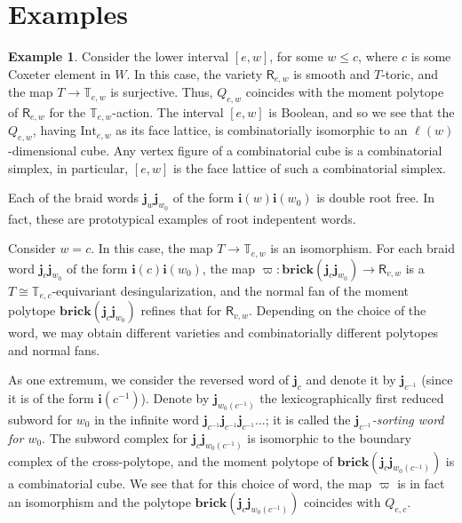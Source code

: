 \documentclass[a4paper, 11pt]{amsart}
\newcommand{\brick}{\mathbf{brick}}
\newcommand{\rich}[1]{\mathsf{R}_{#1}}
\newcommand{\word}[1]{\mathbf{#1}}
\newcommand{\dil}[1]{\mathbb{T}_{#1}}
\theoremstyle{definition}
\newtheorem{example}[theorem]{Example}
\begin{document}
\section{Examples}
\label{sect:examples}

\begin{example}
\label{ex:Coxeter}
Consider the lower interval $[e, w]$, for some $w \leq c$, where $c$ is some Coxeter element in $W$. In this case, the variety $\rich{e,w}$ is smooth and $T$-toric, and the map $T \to \dil{e,w}$ is  surjective. Thus, $Q_{e,w}$ coincides with the moment polytope of $\rich{e,w}$ for the $\dil{e,w}$-action. The interval $[e, w]$ is Boolean, and so we see that the $Q_{e,w}$, having $\mathrm{Int}_{e,w}$ as its face lattice, is combinatorially isomorphic to an $\ell(w)$-dimensional cube. Any vertex figure of a combinatorial cube is a combinatorial simplex, in particular, $[e,w]$ is the face lattice of such a combinatorial simplex. 

Each of the braid words $\word{j}_w \word{j}_{w_0}$ of the form $\word{i}(w)\word{i}(w_0)$ is double root free. In fact, these are prototypical examples of root indepentent words. 

    Consider $w = c$. In this case, the map $T \to \dil{e,w}$ is an isomorphism. For each braid word $\word{j}_c \word{j}_{w_0}$ of the form $\word{i}(c)\word{i}(w_0)$, the map $\varpi: \brick(\word{j}_c \word{j}_{w_0}) \to \rich{v,w}$ is a $T \cong \dil{e,c}$-equivariant desingularization, and the normal fan of the moment polytope $\brick(\word{j}_c \word{j}_{w_0})$ refines that for $\rich{v,w}$. Depending on the choice of the word, we may obtain different varieties and combinatorially different polytopes and normal fans. 

As one extremum, we consider the reversed word of $\word{j}_c$ and denote it by $\word{j}_{c^{-1}}$ (since it is of the form  $\word{i}(c^{-1})$). Denote by $\word{j}_{w_0(c^{-1})}$ the lexicographically first reduced subword for $w_0$ in the infinite word $\word{j}_{c^{-1}}\word{j}_{c^{-1}}\word{j}_{c^{-1}}\ldots$; it is called the \emph{$\word{j}_{c^{-1}}$-sorting word for $w_0$}. The subword complex for $\word{j}_c \word{j}_{w_0(c^{-1})}$ is isomorphic to the boundary complex of the cross-polytope, and the moment polytope of $\brick(\word{j}_c \word{j}_{w_0(c^{-1})})$ is a combinatorial cube. We see that for this choice of word, the map $\varpi$ is in fact an isomorphism and the polytope  $\brick(\word{j}_c \word{j}_{w_0(c^{-1})})$ coincides with $Q_{e,c}$.


\end{example}
\end{document}
